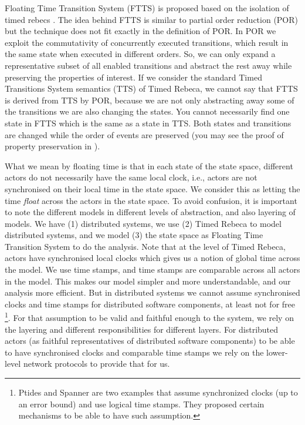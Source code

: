 \begin{figure}[!htbp]
\begin{center}
{ 		}
 		\label{fig::TRebecaSyntax}
 	\end{center}
 \end{figure}


Floating Time Transition System (FTTS) is proposed based on the isolation of timed rebecs \cite{DBLP:conf/facs2/KhamespanahSVK15,DBLP:journals/scp/KhamespanahSSKI15}. The idea behind FTTS is similar to partial order reduction (POR) but the technique does not fit exactly in the definition of POR. 
%
In POR we exploit the commutativity of concurrently executed transitions, which result in the same state when executed in different orders. So, we can only expand a representative subset of all enabled transitions and abstract the rest away while preserving the properties of interest. %
%
If we consider the standard Timed Transitions System semantics (TTS) of Timed Rebeca, we cannot say that FTTS is derived from TTS by POR, because we are not only abstracting away some of the transitions we are also changing the states. You cannot necessarily find one state in FTTS which is the same as a state in TTS. Both states and transitions are changed while the order of events are preserved (you may see the proof of property preservation in \cite{DBLP:conf/facs2/KhamespanahSVK15}).
%

What we mean by floating time is that in each state of the state space, different actors do not necessarily have the same local clock, i.e.,  actors are not synchronised on their local time in the state space. We consider this as letting the time \textit{float} across the actors in the state space. 
To avoid confusion, it is important to note the different models in different levels of abstraction, and also layering of models. We have (1) distributed systems, we use (2) Timed Rebeca to model distributed systems, and we model (3) the state space as Floating Time Transition System to do the analysis. 
%
Note that at the level of Timed Rebeca, actors have synchronised local clocks which gives us a notion of global time across the model. We use time stamps, and time stamps are comparable across all actors in the model. This makes our model simpler and more understandable, and our analysis more efficient.
But in distributed systems we cannot assume synchronised clocks and time stamps for distributed software components, at least not for free \footnote{Ptides\cite{DBLP:conf/dsrt/DerlerLM08} and Spanner\cite{Corbett:2013:SGG:2518037.2491245} are two examples that assume synchronized clocks  (up to an error bound) and use logical time stamps.
They proposed certain mechanisms to be able to have such assumption.}. 
For that assumption to be valid and faithful enough to the system,  we rely on the layering and different responsibilities for different layers. For distributed actors (as faithful representatives of distributed software components) to be able to have synchronised clocks and comparable time stamps we rely on the lower-level network protocols to provide that for us. 

